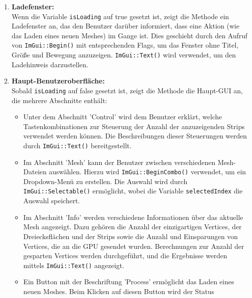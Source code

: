\begin{enumerate}
    \item \textbf{Ladefenster:}
    \\
    Wenn die Variable \lstinline{isLoading} auf true gesetzt ist, zeigt die Methode
    ein Ladefenster an, das den Benutzer darüber informiert, dass eine Aktion (wie
    das Laden eines neuen Meshes) im Gange ist. Dies geschieht durch den Aufruf von
    \lstinline{ImGui::Begin()} mit entsprechenden Flags, um das Fenster ohne Titel, Größe und
    Bewegung anzuzeigen. \lstinline{ImGui::Text()} wird verwendet, um den Ladehinweis
    darzustellen.
    \\
    \item \textbf{Haupt-Benutzeroberfläche:} 
    \\ 
    Sobald \lstinline{isLoading} auf false
    gesetzt ist, zeigt die Methode die Haupt-GUI an, die mehrere Abschnitte
    enthält: 
    \\
    \begin{itemize}
        \item 
        Unter dem Abschnitt 'Control' wird dem Benutzer erklärt, welche
        Tastenkombinationen zur Steuerung der Anzahl der anzuzeigenden Strips
        verwendet werden können. Die Beschreibungen dieser Steuerungen werden
        durch \lstinline{ImGui::Text()} bereitgestellt.
        \\
        \item 
        Im Abschnitt 'Mesh' kann der Benutzer zwischen verschiedenen
        Mesh-Dateien auswählen. Hierzu wird \lstinline{ImGui::BeginCombo()}
        verwendet, um ein Dropdown-Menü zu erstellen. Die Auswahl wird durch
        \lstinline{ImGui::Selectable()} ermöglicht, wobei die Variable
        \lstinline{selectedIndex} die Auswahl speichert. \\
        \item 
        Im Abschnitt 'Info' werden verschiedene Informationen über das aktuelle
        Mesh angezeigt. Dazu gehören die Anzahl der einzigartigen Vertices, der
        Dreiecksflächen und der Strips sowie die Anzahl und Einsparungen von
        Vertices, die an die GPU gesendet wurden. Berechnungen zur Anzahl der
        gesparten Vertices werden durchgeführt, und die Ergebnisse werden
        mittels \lstinline{ImGui::Text()} angezeigt. 
        \\
        \item 
        Ein Button mit der Beschriftung 'Process' ermöglicht das
        Laden eines neuen Meshes. Beim Klicken auf diesen Button wird der Status

\end{itemize}
\end{enumerate}
